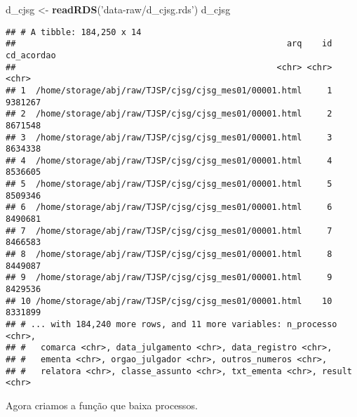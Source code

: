 \documentclass[]{book}
\newenvironment{Shaded}{\begin{snugshade}}{\end{snugshade}}
\newcommand{\KeywordTok}[1]{\textcolor[rgb]{0.13,0.29,0.53}{\textbf{{#1}}}}
\newcommand{\StringTok}[1]{\textcolor[rgb]{0.31,0.60,0.02}{{#1}}}
\newcommand{\NormalTok}[1]{{#1}}
\begin{document}
\begin{Shaded}
\begin{Highlighting}[]
\NormalTok{d_cjsg <-}\StringTok{ }\KeywordTok{readRDS}\NormalTok{(}\StringTok{'data-raw/d_cjsg.rds'}\NormalTok{)}
\NormalTok{d_cjsg}
\end{Highlighting}
\end{Shaded}

\begin{verbatim}
## # A tibble: 184,250 x 14
##                                                      arq    id cd_acordao
##                                                    <chr> <chr>      <chr>
## 1  /home/storage/abj/raw/TJSP/cjsg/cjsg_mes01/00001.html     1    9381267
## 2  /home/storage/abj/raw/TJSP/cjsg/cjsg_mes01/00001.html     2    8671548
## 3  /home/storage/abj/raw/TJSP/cjsg/cjsg_mes01/00001.html     3    8634338
## 4  /home/storage/abj/raw/TJSP/cjsg/cjsg_mes01/00001.html     4    8536605
## 5  /home/storage/abj/raw/TJSP/cjsg/cjsg_mes01/00001.html     5    8509346
## 6  /home/storage/abj/raw/TJSP/cjsg/cjsg_mes01/00001.html     6    8490681
## 7  /home/storage/abj/raw/TJSP/cjsg/cjsg_mes01/00001.html     7    8466583
## 8  /home/storage/abj/raw/TJSP/cjsg/cjsg_mes01/00001.html     8    8449087
## 9  /home/storage/abj/raw/TJSP/cjsg/cjsg_mes01/00001.html     9    8429536
## 10 /home/storage/abj/raw/TJSP/cjsg/cjsg_mes01/00001.html    10    8331899
## # ... with 184,240 more rows, and 11 more variables: n_processo <chr>,
## #   comarca <chr>, data_julgamento <chr>, data_registro <chr>,
## #   ementa <chr>, orgao_julgador <chr>, outros_numeros <chr>,
## #   relatora <chr>, classe_assunto <chr>, txt_ementa <chr>, result <chr>
\end{verbatim}

Agora criamos a função que baixa processos.
\end{document}
